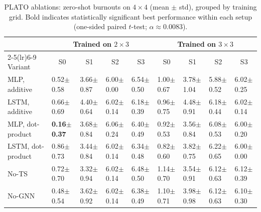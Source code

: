 \begin{table}[h]
\centering
\small
\setlength{\tabcolsep}{1.4pt}
\renewcommand{\arraystretch}{1.02}
\begin{tabular}{@{\hspace{2pt}}l|l|l|l|l||l|l|l|l@{\hspace{2pt}}}
\toprule
& \multicolumn{4}{c||}{Trained on $2\times 3$} & \multicolumn{4}{c}{Trained on $3\times 3$} \\
\cmidrule(lr){2-5}\cmidrule(lr){6-9}
Variant & \multicolumn{1}{c|}{S0} & \multicolumn{1}{c|}{S1} & \multicolumn{1}{c|}{S2} & \multicolumn{1}{c||}{S3}
        & \multicolumn{1}{c|}{S0} & \multicolumn{1}{c|}{S1} & \multicolumn{1}{c|}{S2} & \multicolumn{1}{c}{S3} \\
\midrule
MLP, additive      & 0.52$\pm$0.58 & 3.66$\pm$0.87 & 6.00$\pm$0.00 & 6.54$\pm$0.50
                  & 1.00$\pm$0.67 & 3.78$\pm$1.04 & 5.88$\pm$0.52 & 6.02$\pm$0.25 \\
LSTM, additive     & 0.66$\pm$0.69 & 4.40$\pm$0.64 & 6.02$\pm$0.14 & 6.18$\pm$0.39
                  & 0.96$\pm$0.75 & 4.48$\pm$0.91 & 6.18$\pm$0.44 & 6.02$\pm$0.14 \\
MLP, dot-product   & \textbf{0.16$\pm$0.37} & 3.68$\pm$0.84 & 6.06$\pm$0.24 & 6.40$\pm$0.49
                  & 0.92$\pm$0.53 & 3.56$\pm$0.84 & 6.08$\pm$0.53 & 6.00$\pm$0.20 \\
LSTM, dot-product  & 0.86$\pm$0.73 & 3.44$\pm$0.84 & 6.02$\pm$0.14 & 6.34$\pm$0.48
                  & 0.82$\pm$0.60 & 3.82$\pm$0.75 & 6.22$\pm$0.65 & 6.00$\pm$0.00 \\
No-TS              & 0.72$\pm$0.70 & 3.32$\pm$0.94 & 6.02$\pm$0.14 & 6.48$\pm$0.50
                  & 1.14$\pm$0.70 & 3.54$\pm$0.91 & 6.12$\pm$0.63 & 6.12$\pm$0.39 \\
No-GNN             & 0.48$\pm$0.54 & 3.62$\pm$0.92 & 6.02$\pm$0.14 & 6.38$\pm$0.49
                  & 1.10$\pm$0.71 & 3.98$\pm$0.98 & 6.12$\pm$0.63 & 6.10$\pm$0.30 \\
\bottomrule
\end{tabular}
\caption{PLATO ablations: zero-shot burnouts on $4\times 4$ (mean $\pm$ std), grouped by training grid. Bold indicates statistically significant best performance within each setup (one-sided paired $t$-test; $\alpha\approx0.0083$).}
\label{tab:ablate_4x4_burnouts_merged}
\end{table}



